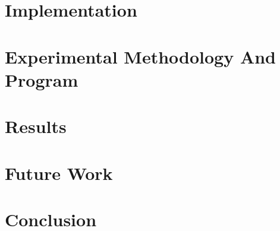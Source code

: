 \documentclass{report}
\begin{document}
\chapter{Implementation}
\label{chapter:implementation}


\chapter{Experimental Methodology And Program}
\label{chapter:experimental_methodology_and_program}


\chapter{Results}
\label{chapter:results}


\chapter{Future Work}
\label{chapter:future_work}


\chapter{Conclusion}
\label{chapter:conclusion}


\newpage

\cite{petabricks} 
\cite{lira} 
\cite{skepu}
\cite{parallel_challenges} 
\cite{mpi} 
\cite{datacenters} 
\cite{muesli}
\cite{free_lunch}
\cite{parallel_landscape}
\cite{posix_threads}
\cite{patterns_and_frameworks}
\cite{openmp}
\cite{using_openmp}
\cite{openmp_home}
\cite{sequential_to_parallel}
\cite{parallel_with_mpi_openmp}
\cite{concurrency_revolution}


 
\end{document}
